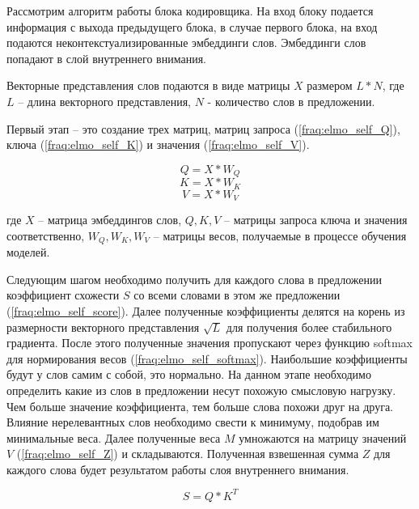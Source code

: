 \documentclass[a4paper,14pt]{article}
\begin{document}
Рассмотрим алгоритм работы блока кодировщика.
На вход блоку подается информация с выхода предыдущего блока, в случае первого блока, на вход подаются неконтекстуализированные эмбеддинги слов.
Эмбеддинги слов попадают в слой внутреннего внимания.

Векторные представления слов подаются в виде матрицы $X$ размером $L*N$, где $L$ -- длина векторного представления, $N$ - количество слов в предложении.

Первый этап -- это создание трех матриц, матриц запроса (\ref{fraq:elmo_self_Q}), ключа (\ref{fraq:elmo_self_K}) и значения (\ref{fraq:elmo_self_V}).

\begin{equation}
	Q = X * W_Q
	\label{fraq:elmo_self_Q}
\end{equation}
\begin{equation}
	K = X * W_K
	\label{fraq:elmo_self_K}
\end{equation}
\begin{equation}
	V = X * W_V
	\label{fraq:elmo_self_V}
\end{equation}

где $X$ -- матрица эмбеддингов слов,
$Q, K, V$ -- матрицы запроса ключа и значения соответственно,
$W_Q, W_K, W_V$ -- матрицы весов, получаемые в процессе обучения моделей.

Следующим шагом необходимо получить для каждого слова в предложении коэффициент схожести $S$ со всеми словами в этом же предложении (\ref{fraq:elmo_self_score}).
Далее полученные коэффициенты делятся на корень из размерности векторного представления $\sqrt{L}$ для получения более стабильного градиента.
После этого полученные значения пропускают через функцию softmax для нормирования весов (\ref{fraq:elmo_self_softmax}).
Наибольшие коэффициенты будут у слов самим с собой, это нормально.
На данном этапе необходимо определить какие из слов в предложении несут похожую смысловую нагрузку.
Чем больше значение коэффициента, тем больше слова похожи друг на друга.
Влияние нерелевантных слов необходимо свести к минимуму, подобрав им минимальные веса.
Далее полученные веса $M$ умножаются на матрицу значений $V$ (\ref{fraq:elmo_self_Z}) и складываются.
Полученная взвешенная сумма $Z$ для каждого слова будет результатом работы слоя внутреннего внимания.

\begin{equation}
	S = Q * K^T
	\label{fraq:elmo_self_score}
\end{equation}
\end{document}
